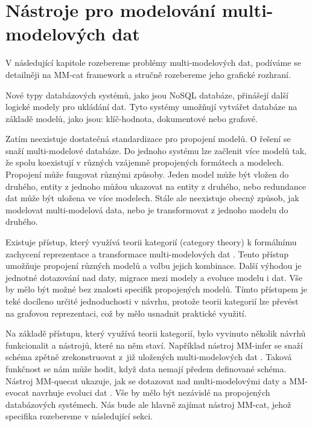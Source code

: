 \pagestyle{plain}  %

\chapter{Nástroje pro modelování multi-modelových dat}

V následující kapitole rozebereme problémy multi-modelových dat, podíváme se detailněji na MM-cat framework a stručně rozebereme jeho grafické rozhraní.

Nové typy databázových systémů, jako jsou NoSQL databáze, přinášejí další logické modely pro ukládání dat. Tyto systémy umožňují vytvářet databáze na základě modelů, jako jsou: klíč-hodnota, dokumentové nebo grafové.

Zatím neexistuje dostatečná standardizace pro propojení modelů. O řešení se snaží multi-modelové databáze. Do jednoho systému lze začlenit více modelů tak, že spolu koexistují v různých vzájemně propojených formátech a modelech. Propojení může fungovat různými způsoby. Jeden model může být vložen do druhého, entity z jednoho můžou ukazovat na entity z druhého, nebo redundance dat může být uložena ve více modelech. Stále ale neexistuje obecný způsob, jak modelovat multi-modelová data, nebo je transformovat z jednoho modelu do druhého.

Existuje přístup, který využívá teorii kategorií (category theory) k formálnímu zachycení reprezentace a transformace multi-modelových dat \cite{cat_theory}. Tento přístup umožňuje propojení různých modelů a volbu jejich kombinace. Další výhodou je jednotné dotazování nad daty, migrace mezi modely a evoluce modelu i dat. Vše by mělo být možné bez znalosti specifik propojených modelů. Tímto přístupem je teké docíleno určité jednoduchosti v návrhu, protože teorii kategorií lze převést na grafovou reprezentaci, což by mělo usnadnit praktické využití.

Na základě přístupu, který využívá teorii kategorií, bylo vyvinuto několik návrhů funkcionalit a nástrojů, které na něm staví. Například nástroj MM-infer se snaží schéma zpětně zrekonstruovat z~již uložených multi-modelových dat \cite{MM_infer}. Taková funkčnost se nám může hodit, když data nemají předem definované schéma. Nástroj MM-quecat ukazuje, jak se dotazovat nad multi-modelovými daty \cite{MM_quecat} a MM-evocat navrhuje evoluci dat \cite{MM_evocat}. Vše by mělo být nezávislé na propojených databázových systémech. Nás bude ale hlavně zajímat nástroj MM-cat, jehož specifika rozebereme v následující sekci.

